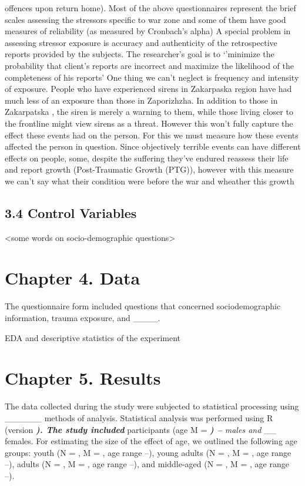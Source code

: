 \documentclass[
  letterpaper,
  DIV=11,
  numbers=noendperiod]{scrartcl}
\begin{document}
offences upon return home). Most of the above questionnaires represent
the brief scales assessing the stressors specific to war zone and some
of them have good measures of reliability (as measured by Cronbach's
alpha) A special problem in assessing stressor exposure is accuracy and
authenticity of the retrospective reports provided by the subjects. The
researcher's goal is to `'minimize the probability that client's reports
are incorrect and maximize the likelihood of the completeness of his
reports' One thing we can't neglect is frequency and intensity of
exposure. People who have experienced sirens in Zakarpaska region have
had much less of an exposure than those in Zaporizhzha. In addition to
those in Zakarpatska , the siren is merely a warning to them, while
those living closer to the frontline might view sirens as a threat.
However this won't fully capture the effect these events had on the
person. For this we must measure how these events affected the person in
question. Since objectively terrible events can have different effects
on people, some, despite the suffering they've endured reassess their
life and report growth (Post-Traumatic Growth (PTG)), however with this
measure we can't say what their condition were before the war and
wheather this growth

\hypertarget{control-variables}{%
\subsection{3.4 Control Variables}\label{control-variables}}

\textless some words on socio-demographic questions\textgreater{}

\hypertarget{chapter-4.-data}{%
\section{Chapter 4. Data}\label{chapter-4.-data}}

The questionnaire form included questions that concerned
sociodemographic information, trauma exposure, and \_\_\_\_.

EDA and descriptive statistics of the experiment

\hypertarget{chapter-5.-results}{%
\section{Chapter 5. Results}\label{chapter-5.-results}}

The data collected during the study were subjected to statistical
processing using \_\_\_\_\_\_ methods of analysis. Statistical analysis
was performed using R (version \textbf{\emph{). The study included}}
participants (age M = \emph{\textbf{) --} males and} \_\_ females. For
estimating the size of the effect of age, we outlined the following age
groups: youth (N = , M = , age range --), young adults (N = , M = , age
range --), adults (N = , M = , age range --), and middle-aged (N = , M =
, age range --).
\end{document}
